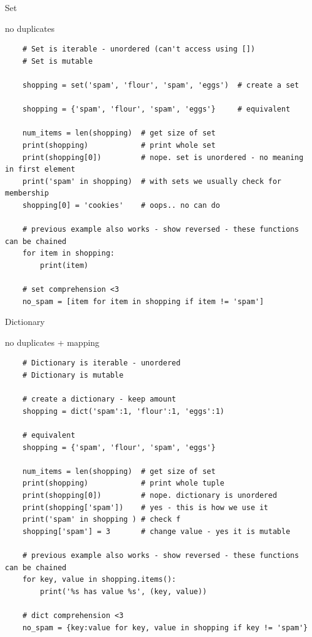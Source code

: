 \documentclass{bredelebeamer}
\begin{document}
\begin{frame}[fragile]{Set}
  \begin{exampleblock}{no duplicates}
    \begin{lstlisting}
    # Set is iterable - unordered (can't access using [])
    # Set is mutable
    
    shopping = set('spam', 'flour', 'spam', 'eggs')  # create a set
    
    shopping = {'spam', 'flour', 'spam', 'eggs'}     # equivalent
    
    num_items = len(shopping)  # get size of set
    print(shopping)            # print whole set
    print(shopping[0])         # nope. set is unordered - no meaning in first element
    print('spam' in shopping)  # with sets we usually check for membership
    shopping[0] = 'cookies'    # oops.. no can do
    
    # previous example also works - show reversed - these functions can be chained
    for item in shopping:
        print(item)
        
    # set comprehension <3
    no_spam = [item for item in shopping if item != 'spam']
    \end{lstlisting}
  \end{exampleblock}
\end{frame}

\begin{frame}[fragile]{Dictionary}
  \begin{exampleblock}{no duplicates + mapping}
    \begin{lstlisting}
    # Dictionary is iterable - unordered
    # Dictionary is mutable
    
    # create a dictionary - keep amount
    shopping = dict('spam':1, 'flour':1, 'eggs':1)
    
    # equivalent
    shopping = {'spam', 'flour', 'spam', 'eggs'}
    
    num_items = len(shopping)  # get size of set
    print(shopping)            # print whole tuple
    print(shopping[0])         # nope. dictionary is unordered
    print(shopping['spam'])    # yes - this is how we use it
    print('spam' in shopping ) # check f
    shopping['spam'] = 3       # change value - yes it is mutable
    
    # previous example also works - show reversed - these functions can be chained
    for key, value in shopping.items():
        print('%s has value %s', (key, value))
        
    # dict comprehension <3
    no_spam = {key:value for key, value in shopping if key != 'spam'}
    \end{lstlisting}
  \end{exampleblock}
\end{frame}
\end{document}

